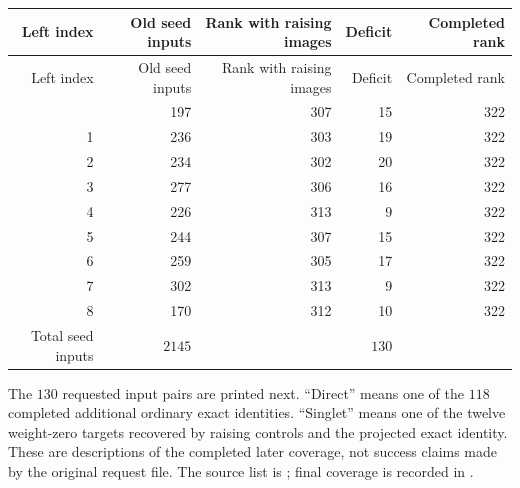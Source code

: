 \begin{longtable}{@{}rrrrr@{}}
\toprule Left index&Old seed inputs&Rank with raising images&Deficit&Completed rank\\\midrule\endfirsthead
\toprule Left index&Old seed inputs&Rank with raising images&Deficit&Completed rank\\\midrule\endhead
\bottomrule\endfoot
0 & 197 & 307 & 15 & 322\\
1 & 236 & 303 & 19 & 322\\
2 & 234 & 302 & 20 & 322\\
3 & 277 & 306 & 16 & 322\\
4 & 226 & 313 & 9 & 322\\
5 & 244 & 307 & 15 & 322\\
6 & 259 & 305 & 17 & 322\\
7 & 302 & 313 & 9 & 322\\
8 & 170 & 312 & 10 & 322\\
\midrule Total seed inputs&$2145$&&$130$&\\
\end{longtable}
The $130$ requested input pairs are printed next. ``Direct'' means
one of the $118$ completed additional ordinary exact identities.
``Singlet'' means one of the twelve weight-zero targets recovered by
raising controls and the projected exact identity. These are descriptions
of the completed later coverage, not success claims made by the original
request file. The source list is
; final
coverage is recorded in
.


